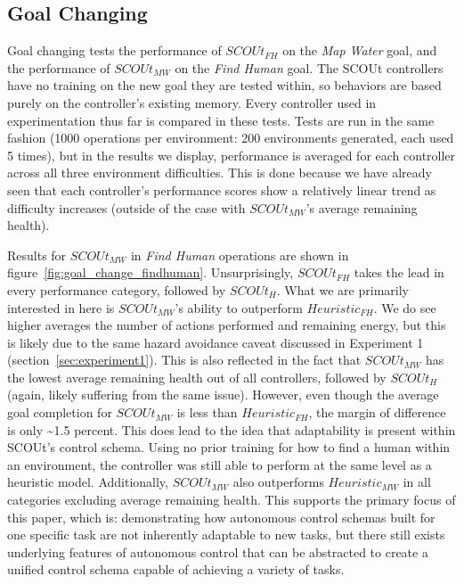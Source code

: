 \subsection{Goal Changing}
Goal changing tests the performance of $SCOUt_{FH}$ on the \textit{Map Water} goal, and the performance of $SCOUt_{MW}$ on the \textit{Find Human} goal.
The SCOUt controllers have no training on the new goal they are tested within, so behaviors are based purely on the controller's existing memory.
Every controller used in experimentation thus far is compared in these tests.
Tests are run in the same fashion (1000 operations per environment: 200 environments generated, each used 5 times), but in the results we display, performance is averaged for each controller across all three environment difficulties.
This is done because we have already seen that each controller's performance scores show a relatively linear trend as difficulty increases (outside of the case with $SCOUt_{MW}$'s average remaining health).

Results for $SCOUt_{MW}$ in \textit{Find Human} operations are shown in figure~\ref{fig:goal_change_findhuman}.
Unsurprisingly, $SCOUt_{FH}$ takes the lead in every performance category, followed by $SCOUt_{H}$.
What we are primarily interested in here is $SCOUt_{MW}$'s ability to outperform $Heuristic_{FH}$.
We do see higher averages the number of actions performed and remaining energy, but this is likely due to the same hazard avoidance caveat discussed in Experiment 1 (section~\ref{sec:experiment1}).
This is also reflected in the fact that $SCOUt_{MW}$ has the lowest average remaining health out of all controllers, followed by $SCOUt_{H}$ (again, likely suffering from the same issue).
However, even though the average goal completion for $SCOUt_{MW}$ is less than $Heuristic_{FH}$, the margin of difference is only \textasciitilde1.5 percent.
This does lead to the idea that adaptability is present within SCOUt's control schema.
Using no prior training for how to find a human within an environment, the controller was still able to perform at the same level as a heuristic model.
Additionally, $SCOUt_{MW}$ also outperforms $Heuristic_{MW}$ in all categories excluding average remaining health.
This supports the primary focus of this paper, which is: demonstrating how autonomous control schemas built for one specific task are not inherently adaptable to new tasks, but there still exists underlying features of autonomous control that can be abstracted to create a unified control schema capable of achieving a variety of tasks.

